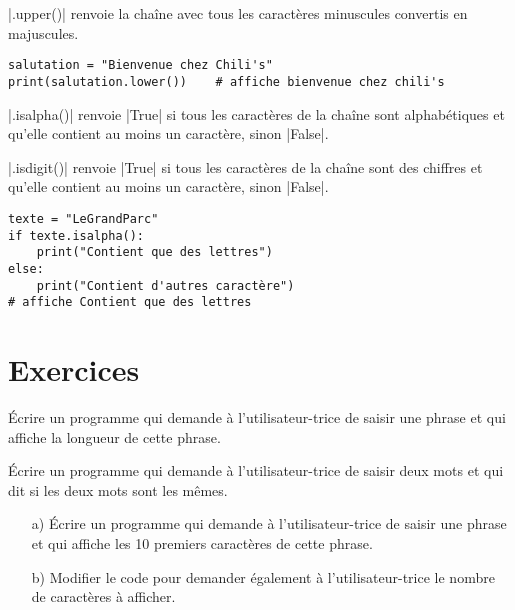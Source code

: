 \documentclass[11pt, a4paper]{book}
\begin{document}
|.upper()| renvoie la chaîne avec tous les caractères minuscules convertis en majuscules.

\begin{lstlisting}
salutation = "Bienvenue chez Chili's"
print(salutation.lower())    # affiche bienvenue chez chili's
\end{lstlisting}
%

|.isalpha()| renvoie |True| si tous les caractères de la chaîne sont alphabétiques et qu'elle contient au moins un caractère, sinon |False|.

|.isdigit()| renvoie |True| si tous les caractères de la chaîne sont des chiffres et qu'elle contient au moins un caractère, sinon |False|.

\begin{lstlisting}
texte = "LeGrandParc"
if texte.isalpha():
    print("Contient que des lettres")
else:
    print("Contient d'autres caractère")
# affiche Contient que des lettres
\end{lstlisting}
%    


\section{Exercices}


\begin{exercice}
Écrire un programme qui demande à l'utilisateur-trice de saisir une phrase et qui affiche la longueur de cette phrase.
\end{exercice}

\begin{exercice}
Écrire un programme qui demande à l'utilisateur-trice de saisir deux mots et qui dit si les deux mots sont les mêmes.
\end{exercice}

\begin{exercice}
\begin{itemize}
\item[a)] Écrire un programme qui demande à l'utilisateur-trice de saisir une phrase et qui affiche les 10 premiers caractères de cette phrase.
\item[b)] Modifier le code pour demander également à l'utilisateur-trice le nombre de caractères à afficher.
\end{itemize}

\end{exercice}
\end{document}
